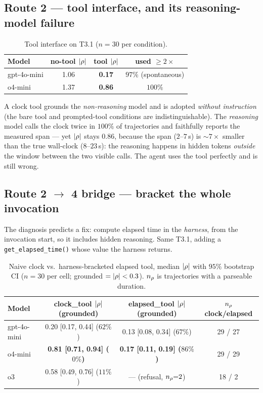 \documentclass[11pt]{article}
\begin{document}
\subsection{Route 2 --- tool interface, and its reasoning-model failure}

\begin{table}[h]
\centering
\small
\caption{Tool interface on T3.1 ($n=30$ per condition).}
\begin{tabular}{lccc}
\toprule
Model & no-tool $|\rho|$ & tool $|\rho|$ & used $\geq 2\times$ \\
\midrule
gpt-4o-mini & 1.06 & \textbf{0.17} & $97\%$ (spontaneous) \\
o4-mini & 1.37 & \textbf{0.86} & $100\%$ \\
\bottomrule
\end{tabular}
\end{table}

A clock tool grounds the \emph{non-reasoning} model and is adopted \emph{without
instruction} (the bare tool and prompted-tool conditions are indistinguishable).
The \emph{reasoning} model calls the clock twice in $100\%$ of trajectories and
faithfully reports the measured span --- yet $|\rho|$ stays $0.86$, because the
span ($2$--$7$\,s) is ${\sim}7\times$ smaller than the true wall-clock
($8$--$23$\,s): the reasoning happens in hidden tokens \emph{outside} the window
between the two visible calls. The agent uses the tool perfectly and is still
wrong.

\subsection{Route 2 $\to$ 4 bridge --- bracket the whole invocation}
The diagnosis predicts a fix: compute elapsed time in the \emph{harness}, from
the invocation start, so it includes hidden reasoning. Same T3.1, adding a
\texttt{get\_elapsed\_time()} whose value the harness returns.

\begin{table}[h]
\centering
\small
\caption{Naive clock vs.\ harness-bracketed elapsed tool, median $|\rho|$ with
$95\%$ bootstrap CI ($n=30$ per cell; grounded $= |\rho| < 0.3$). $n_{\rho}$
is trajectories with a parseable duration.}
\begin{tabular}{lccc}
\toprule
Model & clock\_tool $|\rho|$ (grounded) & elapsed\_tool $|\rho|$ (grounded) & $n_{\rho}$ clock/elapsed \\
\midrule
gpt-4o-mini & 0.20 [0.17, 0.44] ($62\%$) & 0.13 [0.08, 0.34] ($67\%$) & 29 / 27 \\
o4-mini & \textbf{0.81 [0.71, 0.94] ($0\%$)} & \textbf{0.17 [0.11, 0.19] ($86\%$)} & 29 / 29 \\
o3 & 0.58 [0.49, 0.76] ($11\%$) & --- (refusal, $n_{\rho}{=}2$) & 18 / 2 \\
\bottomrule
\end{tabular}
\end{table}
\end{document}
